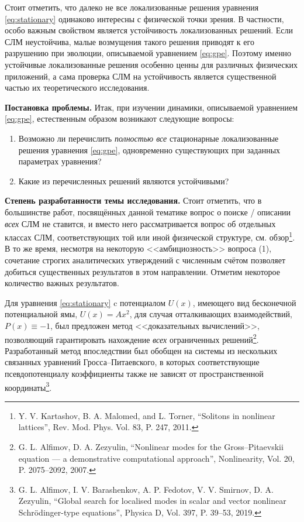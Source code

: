 \documentclass[candidate, href, colorlinks]{disser}
\begin{document}
Стоит отметить, что далеко не все локализованные решения уравнения \eqref{eq:stationary} одинаково интересны с физической точки зрения.
В частности, особо важным свойством является устойчивость локализованных решений.
Если СЛМ неустойчива, малые возмущения такого решения приводят к его разрушению при эволюции, описываемой уравнением \eqref{eq:gpe}.
Поэтому именно устойчивые локализованные решения особенно ценны для различных физических приложений, а сама проверка СЛМ на устойчивость является существенной частью их теоретического исследования.

\textbf{Постановка проблемы.}
Итак, при изучении динамики, описываемой уравнением \eqref{eq:gpe}, естественным образом возникают следующие вопросы:
\begin{enumerate}
	\item Возможно ли перечислить {\it полностью все} стационарные локализованные решения уравнения \eqref{eq:gpe}, одновременно существующих при заданных параметрах уравнения?
	\item Какие из перечисленных решений являются устойчивыми?
\end{enumerate}

\textbf{Степень разработанности темы исследования.}
Стоит отметить, что в большинстве работ, посвящённых данной тематике вопрос о поиске / описании {\it всех} СЛМ не ставится, и вместо него рассматривается вопрос об отдельных классах СЛМ, соответствующих той или иной физической структуре, см. обзор\footnote{Y. V. Kartashov, B. A. Malomed, and L. Torner, ``Solitons in nonlinear lattices'', Rev. Mod. Phys. Vol. 83, P. 247, 2011.}.
В то же время, несмотря на некоторую <<амбициозность>> вопроса (1), сочетание строгих аналитических утверждений с численным счётом позволяет добиться существенных результатов в этом направлении. 
Отметим некоторое количество важных результатов.

Для уравнения \eqref{eq:stationary} c потенциалом $U(x)$, имеющего вид бесконечной потенциальной ямы, $U(x) = A x^2$, для случая отталкивающих взаимодействий, $P(x) \equiv -1$, был предложен метод <<доказательных вычислений>>, позволяющий гарантировать нахождение {\it всех} ограниченных решений\footnote{\label{note:alfzez} G. L. Alfimov, D. A. Zezyulin, ``Nonlinear modes for the Gross--Pitaevskii equation --- a demonstrative computational approach'', Nonlinearity, Vol. 20, P. 2075--2092, 2007.}.
Разработанный метод впоследствии был обобщен на системы из нескольких связанных уравнений Гросса--Питаевского, в которых соответствующие псевдопотенциалу коэффициенты также не зависят от пространственной координаты\footnote{G. L. Alfimov, I. V. Barashenkov, A. P. Fedotov, V. V. Smirnov, D. A. Zezyulin, ``Global search for localised modes in scalar and vector nonlinear Schr{\"o}dinger-type equations'', Physica D, Vol. 397, P. 39--53, 2019.}.
\end{document}
